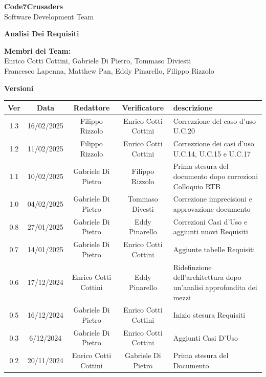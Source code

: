 \documentclass{article}
\begin{document}
\begin{titlepage}
    {\Huge \textbf{Code7Crusaders}}\\
    \vspace{0.5cm}
    {\Large Software Development Team}\\
    \vspace{2cm}
    
    \large \textbf{Analisi Dei Requisiti}
    \vspace{3.9cm}

    \textbf{Membri del Team:}\\
    Enrico Cotti Cottini, Gabriele Di Pietro, Tommaso Diviesti \\
    Francesco Lapenna, Matthew Pan, Eddy Pinarello, Filippo Rizzolo \\
    \vspace{0.5cm}
    
    \vspace{1cm}
\end{titlepage}



\newpage
\begin{center}
    \textbf{Versioni}
    \\
    \vspace{0.3cm}
    \begin{tabular}{|c|c|c|c|>{\centering\arraybackslash}m{}|}
        \hline
        \textbf{Ver} & \textbf{Data} & \textbf{Redattore} & \textbf{Verificatore} & \textbf{descrizione}\\
        \hline
        1.3 & 16/02/2025 & Filippo Rizzolo & Enrico Cotti Cottini & Correzzione del caso d'uso U.C.20 \\
        1.2 & 11/02/2025 & Filippo Rizzolo & Enrico Cotti Cottini & Correzzione dei casi d'uso U.C.14, U.C.15 e U.C.17 \\
        1.1 & 10/02/2025 & Gabriele Di Pietro & Filippo Rizzolo & Prima stesura del documento dopo correzioni Colloquio RTB \\
        1.0 & 04/02/2025 & Gabriele Di Pietro & Tommaso Divesti & Correzione imprecisioni e approvazione documento \\
        0.8 & 27/01/2025 & Gabriele Di Pietro & Eddy Pinarello & Correzioni Casi d'Uso e aggiunti nuovi Requisiti \\
        0.7 & 14/01/2025 & Gabriele Di Pietro & Enrico Cotti Cottini & Aggiunte tabelle Requisiti \\
        0.6 & 17/12/2024 & Enrico Cotti Cottini & Eddy Pinarello & Ridefinzione dell'architettura dopo un'analisi approfondita dei mezzi \\
        0.5 & 16/12/2024 & Gabriele Di Pietro & Enrico Cotti Cottini & Inizio stesura Requisiti \\
        0.3 & 6/12/2024 & Gabriele Di Pietro & Enrico Cotti Cottini & Aggiunti Casi D'Uso \\
        0.2 & 20/11/2024 & Enrico Cotti Cottini & Gabriele Di Pietro & Prima stesura del Documento \\
        \hline
    \end{tabular}
\end{center}
\end{document}
